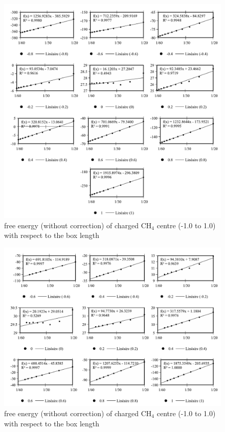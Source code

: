 \begin{figure}[h]
\begin{centering}
\includegraphics[width=1\columnwidth]{_figure/results/ch4_nmax1_lmn}
\par\end{centering}
\caption{free energy (without correction) of charged $\mathrm{C}\mathrm{H}_{4}$
centre (-1.0 to 1.0) with respect to the box length}
\end{figure}

\begin{figure}[h]
\begin{centering}
\includegraphics[width=1\columnwidth]{_figure/results/ch4_nmax5_inter}
\par\end{centering}
\caption{free energy (without correction) of charged $\mathrm{C}\mathrm{H}_{4}$
centre (-1.0 to 1.0) with respect to the box length}
\end{figure}

